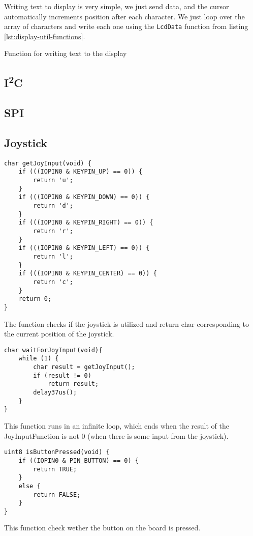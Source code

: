 \documentclass[10pt]{article}
\newcommand{\code}[3]{}
\begin{document}
    Writing text to display is very simple, we just send data, and the cursor automatically increments position after each character.
    We just loop over the array of characters and write each one using the \texttt{LcdData} function from listing \ref{lst:display-util-functions}.

    \begin{program}[H]
        \code{118}{124}{display.h}
        \caption{Function for writing text to the display}
    \end{program}

    \subsection{I\textsuperscript{2}C}

    \subsection{SPI}
    
    \subsection{Joystick}
    	\begin{lstlisting}[caption = {Joystick get input function}]
char getJoyInput(void) {
    if (((IOPIN0 & KEYPIN_UP) == 0)) {
		return 'u';
	}
	if (((IOPIN0 & KEYPIN_DOWN) == 0)) {
		return 'd';
	}
	if (((IOPIN0 & KEYPIN_RIGHT) == 0)) {
		return 'r';
	}
	if (((IOPIN0 & KEYPIN_LEFT) == 0)) {
		return 'l';
	}
	if (((IOPIN0 & KEYPIN_CENTER) == 0)) {
		return 'c';
	}
    return 0;
}
	\end{lstlisting}
	The function checks if the joystick is utilized and return char corresponding to the current position of the joystick.

	\begin{lstlisting}[caption = {Await joystick input function}]
char waitForJoyInput(void){
	while (1) {
		char result = getJoyInput();
		if (result != 0)
			return result;
		delay37us();
	}
}
	\end{lstlisting}
This function runs in an infinite loop, which ends when the result of the JoyInputFunction is not 0 (when there is some input from the joystick).

	\begin{lstlisting}[caption = {Get button input function}]
uint8 isButtonPressed(void) {
	if ((IOPIN0 & PIN_BUTTON) == 0) {
		return TRUE;
	}
	else {
		return FALSE;
	}
}
	\end{lstlisting}
This function check wether the button on the board is pressed.
\end{document}
